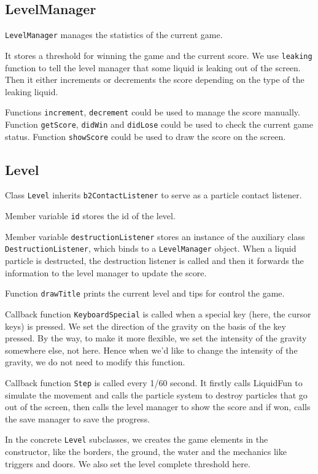 \documentclass{article}
\begin{document}
\subsection{LevelManager}
\verb|LevelManager| manages the statistics of the current game.

It stores a threshold for winning the game and the current score.
We use \verb|leaking| function to tell the level manager that some liquid is leaking out of the screen. Then it either increments or decrements the score depending on the type of the leaking liquid.

Functions \verb|increment|, \verb|decrement| could be used to manage the score manually. Function \verb|getScore|, \verb|didWin| and \verb|didLose| could be used to check the current game status. Function \verb|showScore| could be used to draw the score on the screen.

\subsection{Level}
Class \verb|Level| inherits \verb|b2ContactListener| to serve as a particle contact listener.

Member variable \verb|id| stores the id of the level.

Member variable \verb|destructionListener| stores an instance of the auxiliary class \verb|DestructionListener|, which binds to a \verb|LevelManager| object. When a liquid particle is destructed, the destruction listener is called and then it forwards the information to the level manager to update the score.

Function \verb|drawTitle| prints the current level and tips for control the game.

Callback function \verb|KeyboardSpecial| is called when a special key (here, the cursor keys) is pressed.
We set the direction of the gravity on the basis of the key pressed.
By the way, to make it more flexible, we set the intensity of the gravity somewhere else, not here.
Hence when we'd like to change the intensity of the gravity, we do not need to modify this function.

Callback function \verb|Step| is called every 1/60 second.
It firstly calls LiquidFun to simulate the movement and calls the particle system to destroy particles that go out of the screen, then calls the level manager to show the score and if won, calls the save manager to save the progress.

In the concrete \verb|Level| subclasses, we creates the game elements in the constructor, like the borders, the ground, the water and the mechanics like triggers and doors. 
We also set the level complete threshold here.
\end{document}
